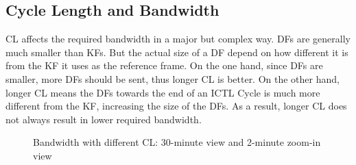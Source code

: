 \documentclass[12pt]{report}
\begin{document}
\subsection{Cycle Length and Bandwidth}
\label{sec:cl_bandwidth}

CL affects the required bandwidth in a major but complex way. DFs are generally much smaller than KFs. But the actual size of a DF depend on how different it is from the KF it uses as the reference frame. On the one hand, since DFs are smaller, more DFs should be sent, thus longer CL is better. On the other hand, longer CL means the DFs towards the end of an ICTL Cycle is much more different from the KF, increasing the size of the DFs. As a result, longer CL does not always result in lower required bandwidth.

\begin{figure}[h]
  \caption{\label{fig:cl}Bandwidth with different CL: 30-minute view and 2-minute zoom-in view}
\end{figure}
\end{document}
